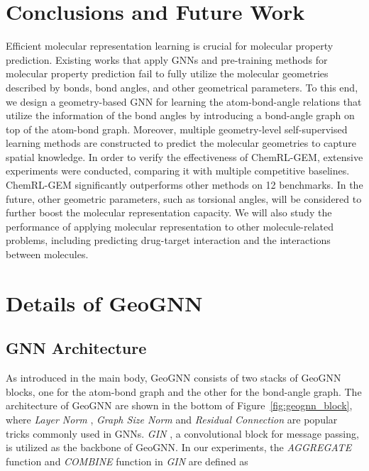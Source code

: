 \documentclass{article}
\begin{document}
\section{Conclusions and Future Work}
Efficient molecular representation learning is crucial for molecular property prediction. Existing works that apply GNNs and pre-training methods for molecular property prediction fail to fully utilize the molecular geometries described by bonds, bond angles, and other geometrical parameters. To this end, we design a geometry-based GNN for learning the atom-bond-angle relations that utilize the information of the bond angles by introducing a bond-angle graph on top of the atom-bond graph. Moreover, multiple geometry-level self-supervised learning methods are constructed to predict the molecular geometries to capture spatial knowledge. In order to verify the effectiveness of ChemRL-GEM, extensive experiments were conducted, comparing it with multiple competitive baselines. ChemRL-GEM significantly outperforms other methods on 12 benchmarks. In the future, other geometric parameters, such as torsional angles, will be considered to further boost the molecular representation capacity. We will also study the performance of applying molecular representation to other molecule-related problems, including predicting drug-target interaction and the interactions between molecules.


\clearpage
\appendix
\appendixpage



\section{Details of GeoGNN} \label{appendix:overall_geognn}
\subsection{GNN Architecture}



As introduced in the main body, GeoGNN consists of two stacks of GeoGNN blocks, one for the atom-bond graph and the other for the bond-angle graph. The architecture of GeoGNN are shown in the bottom of Figure~\ref{fig:geognn_block}, where \textit{Layer Norm} \cite{DBLP:journals/corr/BaKH16}, \textit{Graph Size Norm} \cite{DBLP:journals/corr/abs-2009-11746} and \textit{Residual Connection} \cite{DBLP:conf/cvpr/HeZRS16} are popular tricks commonly used in GNNs. \textit{GIN} \cite{DBLP:conf/iclr/XuHLJ19}, a convolutional block for message passing, is utilized as the backbone of GeoGNN. In our experiments, the \textit{AGGREGATE} function and \textit{COMBINE} function in \textit{GIN} are defined as
 
\end{document}
